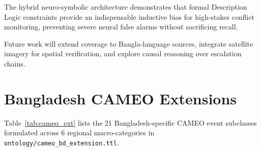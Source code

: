 \documentclass[11pt,a4paper]{article}
\begin{document}
The hybrid neuro-symbolic architecture demonstrates that formal Description Logic
constraints provide an indispensable inductive bias for high-stakes conflict monitoring,
preventing severe neural false alarms without sacrificing recall.

Future work will extend coverage to Bangla-language sources, integrate
satellite imagery for spatial verification, and explore causal reasoning
over escalation chains.




\appendix

\section{Bangladesh CAMEO Extensions}
\label{app:cameo}

Table~\ref{tab:cameo_ext} lists the 21 Bangladesh-specific CAMEO event subclasses formulated across 6 regional macro-categories in \texttt{ontology/cameo\_bd\_extension.ttl}.
\end{document}

